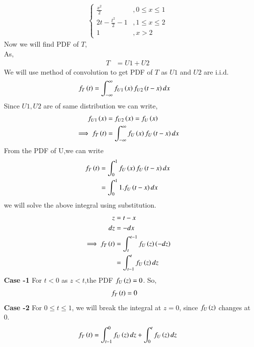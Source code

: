 \documentclass[journal,12pt,twocolumn]{IEEEtran}
\renewcommand\thesection{\arabic{section}}
\begin{document}
\begin{enumerate}[label=\thesection.\arabic*,ref=\thesection.\theenumi]
\begin{enumerate}[label=\thesection.\arabic*
,ref=\thesection.\theenumi]
\begin{align}
\begin{cases}
                                \frac{x^{2}}{2}           &, 0\leq x \leq 1\\
                                2t - \frac{t^{2}}{2} - 1  &, 1 \leq x \leq 2\\
                                   1                      &,   x > 2
                              \end{cases}
    \end{align}                      
 Now we will find PDF of $T$,\\
 As,
   \begin{align}
           T &= U1 + U2
   \end{align}
  We will use method of convolution to get PDF of $T$ as $ U1$ and $U2$ are i.i.d.
   \begin{align}
          f_{T}\left(t\right) &= \int_{-\infty}^{\infty}f_{U1}\left(x\right)f_{U2}\left(t-x\right)dx
   \end{align}
  Since $ U1,U2$ are of same distribution we can write,
   \begin{align}
           f_{U1}\left(x\right) &= f_{U2}\left(x\right) = f_{U}\left(x\right)\\
           \implies f_{T}\left(t\right) &= \int_{-\infty}^{\infty}f_{U}\left(x\right)f_{U}\left(t-x\right)dx
   \end{align}
 From the PDF of U,we can write
  \begin{align}
          f_{T}\left(t\right) &= \int_{0}^{1}f_{U}\left(x\right)f_{U}\left(t-x\right)dx\\
                        &= \int_{0}^{1}1.f_{U}\left(t-x\right)dx\\
  \end{align}
  we will solve the above integral using substitution.
  \begin{align}
            z &= t-x \\
           dz &= -dx \\
          \implies f_{T}\left(t\right) &= \int_{t}^{t-1}f_{U}\left(z\right)\left(-dz\right)\\
                                 &= \int_{t-1}^{t}f_{U}\left(z\right)dz
  \end{align}
 \textbf{Case -1} For $ t<0 $ as $ z <t $,the PDF $ f_{U}\left(z\right) = 0 $. So,
  \begin{align}
          f_{T}\left(t\right) &= 0
  \end{align}
 \textbf{Case -2} For $ 0 \leq t \leq 1$, we will break the integral at $z = 0$, since $f_{U}\left(z\right)$ changes at 0.
  \begin{align}
          f_{T}\brak{t} &= \int_{t-1}^{0}f_{U}\brak{z}dz + \int_{0}^{t}f_{U}\brak{z}dz\\

\end{align}
\end{enumerate}
\end{enumerate}
\end{document}
